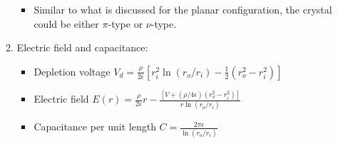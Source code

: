 \begin{enumerate}
\begin{enumerate}
\begin{itemize}
            \item Similar to what is discussed for the planar configuration, the crystal could be either $\pi$-type or $\nu$-type. 
        \end{itemize}
        \item Electric field and capacitance:
        \begin{itemize}
            \item Depletion voltage $V_d=\frac{\rho}{2\epsilon}[r_i^2\ln(r_o/r_i)-\frac{1}{2}(r_o^2-r_i^2)]$
            \item Electric field $E(r)=\frac{\rho}{2\epsilon}r-\frac{[V+(\rho/4\epsilon)(r_o^2-r_i^2)]}{r\ln(r_o/r_i)}$
            \item Capacitance per unit length $C=\frac{2\pi\epsilon}{\ln(r_o/r_i)}$
        \end{itemize}
    \end{enumerate}
\end{enumerate}
